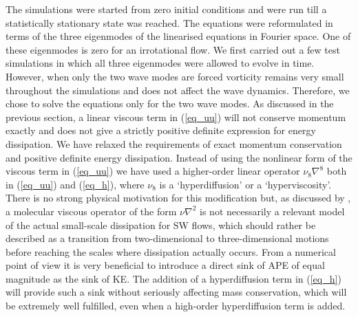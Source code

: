 The simulations were started from zero initial
conditions and were run till a statistically stationary state was reached. The
equations were reformulated in terms of the three eigenmodes of the linearised
equations in Fourier space. One of these eigenmodes is zero for an irrotational
flow. We first carried out a few test simulations in which all three eigenmodes
were allowed to evolve in time. However, when only the two wave modes are
forced vorticity remains very small throughout the simulations and does not
affect the wave dynamics. Therefore, we chose to solve the equations only for
the two wave modes. As discussed in the previous section, a linear viscous term
in (\ref{eq_uu}) will not conserve momentum exactly and does not give a
strictly positive definite expression for energy dissipation. We have relaxed
the requirements of exact momentum conservation and positive definite energy
dissipation. Instead of using the nonlinear form of the viscous term in
(\ref{eq_uu}) we have used a higher-order linear operator $ \nu_8 \nabla^{8} $
both in (\ref{eq_uu}) and (\ref{eq_h}), where $ \nu_8 $ is a `hyperdiffusion'
or a `hyperviscosity'. There is no strong physical motivation for this
modification but, as discussed by \cite{FargeSadourny1989}, a molecular viscous
operator of the form $\nu \nabla^2 $ is not necessarily a relevant model of the
actual small-scale dissipation for SW flows, which should rather be described
as a transition from two-dimensional to three-dimensional motions before
reaching the scales where dissipation actually occurs.
From a numerical point of view it is very beneficial to introduce a direct sink of APE of equal magnitude as the sink of KE.
The addition of a hyperdiffusion term in (\ref{eq_h}) will provide such a sink without seriously affecting mass conservation, which will be
extremely well fulfilled, even when a high-order hyperdiffusion term is added.

